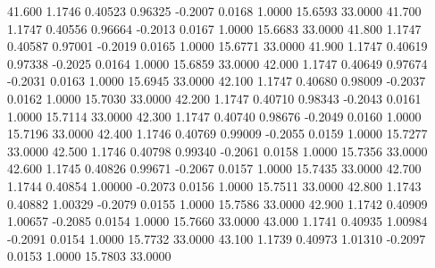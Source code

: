   41.600   1.1746   0.40523   0.96325  -0.2007   0.0168   1.0000  15.6593  33.0000
  41.700   1.1747   0.40556   0.96664  -0.2013   0.0167   1.0000  15.6683  33.0000
  41.800   1.1747   0.40587   0.97001  -0.2019   0.0165   1.0000  15.6771  33.0000
  41.900   1.1747   0.40619   0.97338  -0.2025   0.0164   1.0000  15.6859  33.0000
  42.000   1.1747   0.40649   0.97674  -0.2031   0.0163   1.0000  15.6945  33.0000
  42.100   1.1747   0.40680   0.98009  -0.2037   0.0162   1.0000  15.7030  33.0000
  42.200   1.1747   0.40710   0.98343  -0.2043   0.0161   1.0000  15.7114  33.0000
  42.300   1.1747   0.40740   0.98676  -0.2049   0.0160   1.0000  15.7196  33.0000
  42.400   1.1746   0.40769   0.99009  -0.2055   0.0159   1.0000  15.7277  33.0000
  42.500   1.1746   0.40798   0.99340  -0.2061   0.0158   1.0000  15.7356  33.0000
  42.600   1.1745   0.40826   0.99671  -0.2067   0.0157   1.0000  15.7435  33.0000
  42.700   1.1744   0.40854   1.00000  -0.2073   0.0156   1.0000  15.7511  33.0000
  42.800   1.1743   0.40882   1.00329  -0.2079   0.0155   1.0000  15.7586  33.0000
  42.900   1.1742   0.40909   1.00657  -0.2085   0.0154   1.0000  15.7660  33.0000
  43.000   1.1741   0.40935   1.00984  -0.2091   0.0154   1.0000  15.7732  33.0000
  43.100   1.1739   0.40973   1.01310  -0.2097   0.0153   1.0000  15.7803  33.0000
